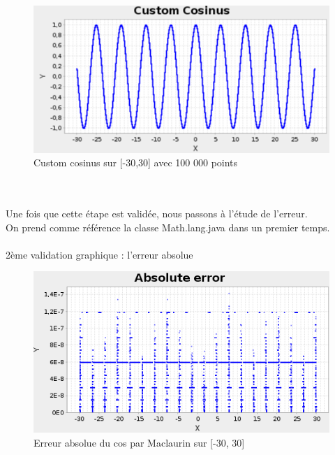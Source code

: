\documentclass[12pt]{article}
\begin{document}
\begin{figure}[ht]
    \begin{center}
      \includegraphics[scale=0.35]{CosTay.png}
      \caption{Custom cosinus sur [-30,30] avec 100 000 points}
      \label{Custom cosinus sur [-30,30] avec 100 000 points}
    \end{center}
\end{figure}

\newline
\newline
\\
\\
Une fois que cette étape est validée, nous passons à l'étude de l'erreur. \\
On prend comme référence
la classe Math.lang.java dans un premier temps. \\ \\
\newpage
2ème validation graphique : l'erreur absolue \\

\begin{figure}[ht]
    \begin{center}
      \includegraphics[scale=0.28]{ErrorAbsCosTay.png}
      \caption{Erreur absolue du cos par Maclaurin sur [-30, 30]}
      \label{Erreur absolue du cos par Maclaurin sur [-30, 30] avec 100 000 points}
    \end{center}
\end{figure}
\end{document}
